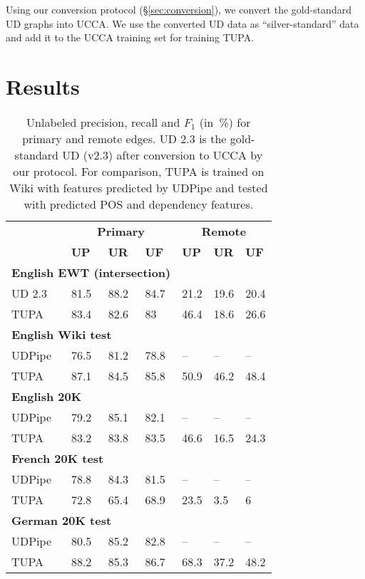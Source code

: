 \documentclass[11pt,a4paper]{article}
\begin{document}
Using our conversion protocol (\S\ref{sec:conversion}),
we convert the gold-standard UD graphs into UCCA.
We use the converted UD data as ``silver-standard'' data \cite{W17-7306,N18-1104}
and add it to the UCCA training set for training TUPA.

\section{Results}\label{sec:results}


\begin{table}[t]
\centering
\begin{tabular}{l|lll|lll}
& \multicolumn{3}{c|}{\footnotesize \bf Primary} & \multicolumn{3}{c}{\footnotesize \bf Remote} \\
& \footnotesize \textbf{UP} & \footnotesize \textbf{UR} & \footnotesize \textbf{UF}
& \footnotesize \textbf{UP} & \footnotesize \textbf{UR} & \footnotesize \textbf{UF} \\
\hline
\multicolumn{4}{l|}{\small \bf English EWT (intersection)} & \\
\footnotesize UD 2.3
& 81.5 & 88.2 & 84.7 & 21.2 & 19.6 & 20.4 \\
\footnotesize TUPA
& 83.4 & 82.6 & 83 & 46.4 & 18.6 & 26.6 \\
\multicolumn{4}{l|}{\small \bf English Wiki test} & \\
\footnotesize UDPipe
& 76.5 & 81.2 & 78.8 & -- & -- & -- \\
\footnotesize TUPA
& 87.1 & 84.5 & 85.8 & 50.9 & 46.2 & 48.4 \\
\multicolumn{4}{l|}{\small \bf English 20K} & \\
\footnotesize UDPipe
& 79.2 & 85.1 & 82.1 & -- & -- & -- \\
\footnotesize TUPA
& 83.2 & 83.8 & 83.5 & 46.6 & 16.5 & 24.3 \\
\multicolumn{4}{l|}{\small \bf French 20K test} & \\
\footnotesize UDPipe
& 78.8 & 84.3 & 81.5 & -- & -- & -- \\
\footnotesize TUPA
& 72.8 & 65.4 & 68.9 & 23.5 & 3.5 & 6 \\
\multicolumn{4}{l|}{\small \bf German 20K test} & \\
\footnotesize UDPipe
& 80.5 & 85.2 & 82.8 & -- & -- & -- \\
\footnotesize TUPA
& 88.2 & 85.3 & 86.7 & 68.3 & 37.2 & 48.2
\end{tabular}
\caption{
Unlabeled precision, recall and $F_1$ (in~\%) for primary and remote edges.
UD 2.3 is the gold-standard UD (v2.3) after conversion to UCCA by our protocol.
For comparison, TUPA \protect\cite{hershcovich2017a} is trained on Wiki with features predicted by UDPipe
and tested with predicted POS and dependency features.
\label{tab:conversion_results_unlabeled}}
\end{table}
\end{document}
